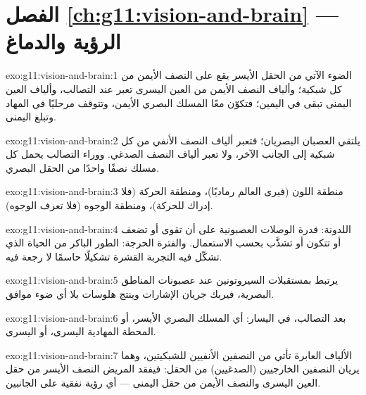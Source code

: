 \section*{الفصل \ref{ch:g11:vision-and-brain} --- الرؤية والدماغ}

\begin{solution}{exo:g11:vision-and-brain:1}
الضوء الآتي من الحقل الأيسر يقع على النصف الأيمن من كل شبكية؛ وألياف
النصف الأيمن من العين اليسرى تعبر عند التصالب، وألياف العين اليمنى
تبقى في اليمين؛ فتكوّن معًا المسلك البصري الأيمن، وتتوقف مرحليًا في
المهاد وتبلغ  اليمنى.
\end{solution}

\begin{solution}{exo:g11:vision-and-brain:2}
يلتقي العصبان البصريان؛ فتعبر ألياف النصف الأنفي من كل شبكية إلى
الجانب الآخر، ولا تعبر ألياف النصف الصدغي. ووراء التصالب يحمل كل مسلك
نصفًا واحدًا من الحقل البصري.
\end{solution}

\begin{solution}{exo:g11:vision-and-brain:3}
منطقة اللون (فيرى العالم رماديًا)، ومنطقة الحركة (فلا إدراك للحركة)،
ومنطقة الوجوه (فلا تعرف الوجوه).
\end{solution}

\begin{solution}{exo:g11:vision-and-brain:4}
اللدونة: قدرة الوصلات العصبونية على أن تقوى أو تضعف أو تتكون أو تشذَّب
بحسب الاستعمال. والفترة الحرجة: الطور الباكر من الحياة الذي تشكّل فيه
التجربة القشرة تشكيلًا حاسمًا لا رجعة فيه.
\end{solution}

\begin{solution}{exo:g11:vision-and-brain:5}
يرتبط بمستقبلات السيروتونين عند عصبونات المناطق البصرية، فيربك جريان
الإشارات وينتج هلوسات بلا أي ضوء موافق.
\end{solution}

\begin{solution}{exo:g11:vision-and-brain:6}
بعد التصالب، في اليسار: أي المسلك البصري الأيسر، أو المحطة المهادية
اليسرى، أو  اليسرى.
\end{solution}

\begin{solution}{exo:g11:vision-and-brain:7}
الألياف العابرة تأتي من النصفين الأنفيين للشبكيتين، وهما يريان النصفين
الخارجيين (الصدغيين) من الحقل: فيفقد المريض النصف الأيسر من حقل العين
اليسرى والنصف الأيمن من حقل اليمنى --- أي رؤية نفقية على الجانبين.
\end{solution}

